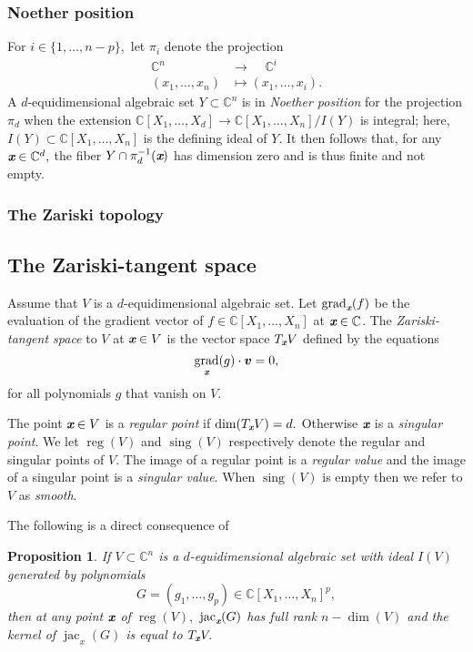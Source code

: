 \documentclass[a4paper]{article}
\def\xb{\textit{\textbf{x}}}
\DeclareMathOperator{\sing}{sing}
\DeclareMathOperator{\jac}{jac}
\DeclareMathOperator{\grad}{grad}
\DeclareMathOperator{\reg}{reg}
\def\C{\mathbb{C}}
\newtheorem{prop}[theorem]{Proposition}
\begin{document}
\subsubsection{Noether position}
For $i \in
\{1,\hdots,n-p\},$  let $\pi_i$ denote the projection 
%
\begin{align*}
\C^n~~~~~ &\rightarrow~~~~~ \C^i \\
(x_1,\hdots,x_n) &\mapsto  (x_1,\hdots,x_i).    
\end{align*} 
A $d$-equidimensional algebraic set $Y \subset \C^n$ is in \textit{Noether position} for the projection
$\pi_d$ when the extension $\C[X_1,\hdots,X_{d}] \rightarrow
\C[X_1,\hdots,X_n]/I(Y)$ is integral; here, $I(Y) \subset
\C[X_1,\hdots,X_n]$ is the defining ideal of $Y$. It then follows that, for any $\xb \in \C^d,$ the fiber $Y \cap \pi_d^{-1}(\xb)$ has dimension zero and is thus finite and not empty.


\subsubsection{The Zariski topology}


\subsection{The Zariski-tangent space}
Assume that $V$ is a $d$-equidimensional algebraic set. Let $\grad_{\xb}(f)$ be the evaluation of the gradient vector of $f \in \C[X_1,\hdots,X_n]$ at $\xb \in \C$. The \textit{Zariski-tangent space} to $V$ at $\xb \in V$ is the vector space $T_{\xb}V$ defined by the equations 
\[
\grad_{\xb} (g) \cdot \bm v = 0,
\] 
for all polynomials $g$ that vanish on $V$. 
\par 
The point $\xb \in V$ is a \textit{regular point} if $\dim (T_{\xb}V) = d.$ Otherwise $\xb$ is a \textit{singular point}. We let $\reg(V)$ and $\sing(V)$ respectively denote the regular and singular points of $V$. The image of a regular point is a \textit{regular value} and the image of a singular point is a \textit{singular value}. When $\sing(V)$ is empty then we refer to $V$ as \textit{smooth}.
%
\par 
The following is a direct consequence of \cite[Corollary 16.20]{ECA}
%
\begin{prop}
If $V \subset \C^n$ is a $d$-equidimensional algebraic set with ideal $I(V)$ generated by polynomials 
\[
G=(g_1,\hdots,g_p) \in \C[X_1,\hdots,X_n]^p,
\]
then at any point $\xb$ of $\reg(V),$ $\jac_{\xb}(G)$ has full rank $n - \dim(V)$ and the kernel of $\jac_x(G)$ is equal to $T_{\xb}V.$ 
\end{prop}
%
\end{document}
